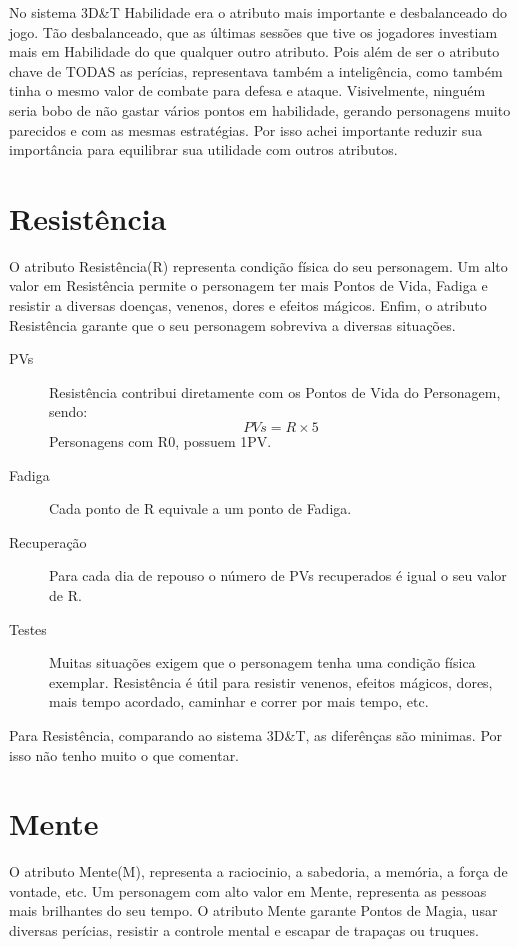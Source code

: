 \begin{framed}
No sistema 3D\&T Habilidade era o atributo mais importante e desbalanceado do jogo. Tão desbalanceado, que as últimas sessões que tive os jogadores investiam mais em Habilidade do que qualquer outro atributo. Pois além de ser o atributo chave de TODAS as perícias, representava também a inteligência, como também tinha o mesmo valor de combate para defesa e ataque. Visivelmente, ninguém seria bobo de não gastar vários pontos em habilidade, gerando personagens muito parecidos e com as mesmas estratégias. Por isso achei importante reduzir sua importância para equilibrar sua utilidade com outros atributos.
\end{framed}

\section{Resistência}
O atributo Resistência(R) representa condição física do seu personagem. Um alto valor em Resistência permite o personagem ter mais Pontos de Vida, Fadiga e resistir a diversas doenças, venenos, dores e efeitos mágicos. Enfim, o atributo Resistência garante que o seu personagem sobreviva a diversas situações.

\begin{description}
\item[PVs] Resistência contribui diretamente com os Pontos de Vida do Personagem, sendo:
\[PVs = R \times 5 \]
Personagens com R0, possuem 1PV.
\item[Fadiga] Cada ponto de R equivale a um ponto de Fadiga.
\item[Recuperação] Para cada dia de repouso o número de PVs recuperados é igual o seu valor de R. 
\item[Testes] Muitas situações exigem que o personagem tenha uma condição física exemplar. Resistência é útil para resistir venenos, efeitos mágicos, dores, mais tempo acordado, caminhar e correr por mais tempo, etc.
\end{description}

\begin{framed}
Para Resistência, comparando ao sistema 3D\&T, as diferênças são minimas. Por isso não tenho muito o que comentar.
\end{framed}

\section{Mente}
O atributo Mente(M), representa a raciocinio, a sabedoria, a memória, a força de vontade, etc. Um personagem com alto valor em Mente, representa as pessoas mais brilhantes do seu tempo. O atributo Mente garante Pontos de Magia, usar diversas perícias, resistir a controle mental e escapar de trapaças ou truques.


